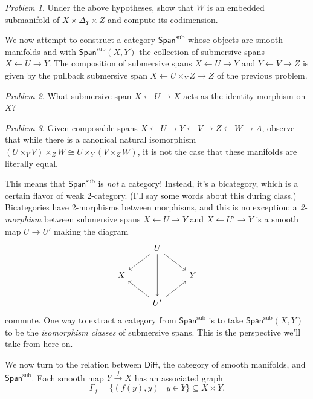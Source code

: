 \documentclass[11pt,twoside]{amsart}
\theoremstyle{plain}
\theoremstyle{remark}
\newtheorem{prob}{Problem}
\theoremstyle{definition}
\theoremstyle{definition}
\newcommand{\subspan}{\mathsf{Span}^{\mathrm{sub}}}
\newcommand{\Diff}{\mathsf{Diff}}
\begin{document}
\begin{prob}
Under the above hypotheses, show that $W$ is an embedded submanifold of $X\times \Delta_Y\times Z$ and compute its codimension.
\end{prob}

We now attempt to construct a category $\subspan$ whose objects are smooth manifolds and with $\subspan(X,Y)$ the collection of submersive spans $X\leftarrow U\to Y$. The composition of submersive spans $X\leftarrow U\to Y$ and $Y\leftarrow V\to Z$ is given by the pullback submersive span $X\leftarrow U\times_Y Z\to Z$ of the previous problem.

\begin{prob}
What submersive span $X\leftarrow U\to X$ acts as the identity morphism on $X$?
\end{prob}

\begin{prob}
Given composable spans $X\leftarrow U\to Y\leftarrow V\to Z\leftarrow W\to A$, observe that while there is a canonical natural isomorphism $(U\times_Y V)\times_Z W\cong U\times_Y (V\times_Z W)$, it is not the case that these manifolds are literally equal.
\end{prob}

This means that $\subspan$ is \emph{not} a category! Instead, it's a bicategory, which is a certain flavor of weak 2-category. (I'll say some words about this during class.) Bicategories have 2-morphisms between morphisms, and this is no exception: a \emph{2-morphism} between submersive spans $X\leftarrow U\to Y$ and $X\leftarrow U'\to Y$ is a smooth map $U\to U'$ making the diagram
\[\begin{tikzcd}
  & U \\
  X && Y \\
  & {U'}
  \arrow[from=1-2, to=2-1]
  \arrow[from=1-2, to=2-3]
  \arrow[from=3-2, to=2-1]
  \arrow[from=3-2, to=2-3]
  \arrow[from=1-2, to=3-2]
\end{tikzcd}\]
commute. One way to extract a category from $\subspan$ is to take $\subspan(X,Y)$ to be the \emph{isomorphism classes} of submersive spans. This is the perspective we'll take from here on.

We now turn to the relation between $\Diff$, the category of smooth manifolds, and $\subspan$. Each smooth map $Y\xrightarrow f X$ has an associated graph
\[
  \Gamma_f = \{(f(y),y)\mid y\in Y\}\subseteq X\times Y.
\]
\end{document}
